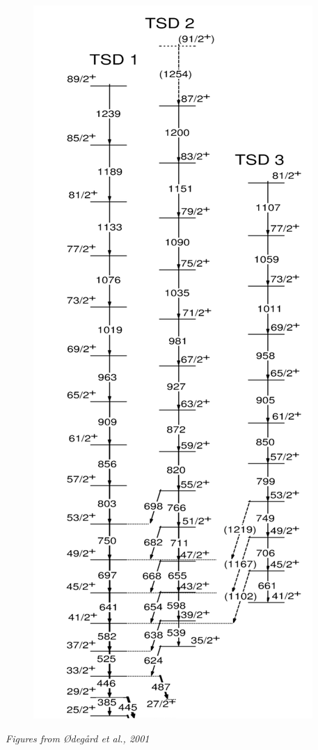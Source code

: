 \documentclass{beamer}
\begin{document}
\begin{frame}
\begin{figure}
    \includegraphics[scale=0.1]{Figs/collective-levels.pdf}
  \end{figure}
  \tiny{\textit{Figures from Ødegård et al., 2001}}
\end{frame}
\end{document}
